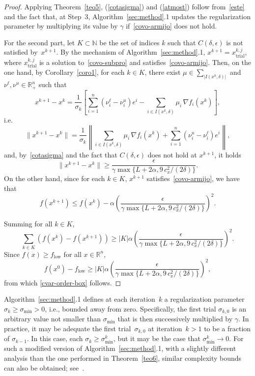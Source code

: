\documentclass[11pt]{article}
\newcommand{\R}{\mathbb{R}}
\newcommand{\N}{\mathbb{N}}
\newcommand{\xkjtrial}{x^{k,j}_{\mathrm{trial}}}
\newcommand{\flow}{f_{\mathrm{low}}}
\newcommand{\simplex}{\textstyle\sum}
\begin{document}
\begin{proof}
Applying Theorem~\ref{teo5}, (\ref{cotasigma}) and (\ref{atmost}) follow from~\eqref{este} and the fact that, at Step~3, Algorithm~\ref{sec:method}.1 updates the regularization parameter by multiplying its value by $\gamma$ if~\eqref{covo-armijo} does not hold.

For the second part, let $K\subset\N$ be the set of indices $k$ such that $C(\delta,\epsilon)$ is not satisfied by~$x^{k+1}$. By the mechanism of Algorithm~\ref{sec:method}.1, $x^{k+1}=\xkjtrial$, where $\xkjtrial$ is a solution to~\eqref{covo-subpro} and satisfies~\eqref{covo-armijo}. Then, on the one hand, by Corollary~\ref{coro1}, for each $k \in K$, there exist $\mu \in \simplex_{|I(x^k,\delta)|}$ and $\nu^\ell, \nu^u \in \R^n_{+}$ such that
\[
x^{k+1} - x^k = \dfrac{1}{\sigma_k} \left[ \sum_{i=1}^n \left( \nu^\ell_i - \nu^u_i \right) e^i - \sum_{i \in I(x^k,\delta)} \mu_i \, \nabla f_i(x^k) \right],
\]
i.e.\
\[
\| x^{k+1} - x^k \| = \dfrac{1}{\sigma_k} \left\| \sum_{i \in I(x^k,\delta)} \mu_i \, \nabla f_i(x^k) + \sum_{i=1}^n \left( \nu^u_i - \nu^\ell_i \right) e^i \right\|,
\]
and, by~\eqref{cotasigma} and the fact that $C(\delta,\epsilon)$ does not hold at $x^{k+1}$, it holds
\[
\| x^{k+1} - x^k \| \geq \dfrac{\epsilon}{\gamma \max \{ L + 2\alpha, 9\,c_x^2/(2\delta) \}}.
\]
On the other hand, since for each $k \in K$, $x^{k+1}$ satisfies~\eqref{covo-armijo}, we have that
\[
f(x^{k+1}) \leq f(x^k) - \alpha \left( \dfrac{\epsilon}{\gamma \max \{ L + 2\alpha, 9\,c_x^2/(2\delta) \}} \right)^2.
\]

Summing for all $k \in K$,
\[
\sum_{k\in K} \left( f(x^k) - f(x^{k+1}) \right) \geq |K| \alpha \left( \dfrac{\epsilon}{\gamma \max \{ L + 2\alpha, 9\,c_x^2/(2\delta) \}} \right)^2.
\]
Since $f(x) \geq \flow$ for all $x \in \R^n$,
\[
f(x^0) - \flow \geq |K| \alpha \left( \dfrac{\epsilon}{\gamma \max \{ L + 2\alpha, 9\,c_x^2/(2\delta) \}} \right)^2,
\]
from which \eqref{cvar-order-box} follows.
\end{proof}

Algorithm~\ref{sec:method}.1 defines at each iteration~$k$ a regularization parameter $\sigma_k \geq \sigma_{\min} > 0$, i.e., bounded away from zero. Specifically, the first trial $\sigma_{k,0}$ is an arbitrary value not smaller than $\sigma_{\min}$ that is then successively multiplied by $\gamma$. In practice, it may be adequate the first trial~$\sigma_{k,0}$ at iteration~$k>1$ to be a fraction of $\sigma_{k-1}$. In this case, each $\sigma_k \geq \sigma_{\min}^k$, but it may be the case that $\sigma_{\min}^k \to 0$. For such a modified version of Algorithm~\ref{sec:method}.1, with a slightly different analysis than the one performed in Theorem~\ref{teo6}, similar complexity bounds can also be obtained; see~\cite[\S4]{bgms}.
\end{document}
